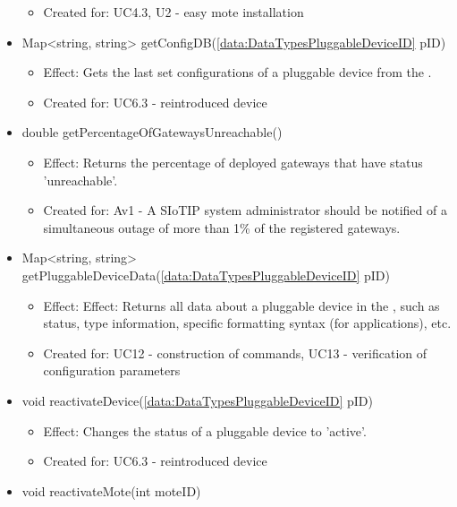 \begin{description}
\begin{itemize}[noitemsep,nolistsep,leftmargin=-.25cm]
\begin{itemize}[noitemsep,nolistsep]
\item Created for: UC4.3, U2 - easy mote installation
        \end{itemize}
      \item \textsf{Map\textless{}string, string\textgreater{} getConfigDB(\ref{data:DataTypesPluggableDeviceID} pID)}
        \begin{itemize}[noitemsep,nolistsep]
           \item Effect: Gets the last set configurations of a pluggable device from the .
\item Created for: UC6.3 - reintroduced device
        \end{itemize}
      \item \textsf{double getPercentageOfGatewaysUnreachable()}
        \begin{itemize}[noitemsep,nolistsep]
           \item Effect: Returns the percentage of deployed gateways that have status 'unreachable'.
\item Created for: Av1 - A SIoTIP system administrator should be notified of a simultaneous outage of more than 1\% of the registered gateways.
        \end{itemize}
      \item \textsf{Map\textless{}string, string\textgreater{} getPluggableDeviceData(\ref{data:DataTypesPluggableDeviceID} pID)}
        \begin{itemize}[noitemsep,nolistsep]
           \item Effect: Effect: Returns all data about a pluggable device in the , such as status, type information, specific formatting syntax (for applications), etc.
\item Created for: UC12 - construction of commands, UC13 - verification of configuration parameters
        \end{itemize}
      \item \textsf{void reactivateDevice(\ref{data:DataTypesPluggableDeviceID} pID)}
        \begin{itemize}[noitemsep,nolistsep]
           \item Effect: Changes the status of a pluggable device to 'active'.
\item Created for: UC6.3 - reintroduced device
        \end{itemize}
      \item \textsf{void reactivateMote(int moteID)}
        \begin{itemize}

\end{itemize}
\end{itemize}
\end{description}
